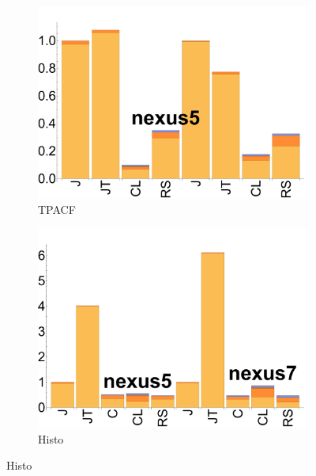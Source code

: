 \begin{figure}[ht]
  \begin{subfigure}[b]{0.3\textwidth}
      \includegraphics[width=\textwidth]{data/bbattery_tpacf.pdf}
      \caption{TPACF} \label{fig:b_TPACF}
  \end{subfigure}

  \begin{subfigure}[b]{0.3\textwidth}
      \includegraphics[width=\textwidth]{data/bbattery_histogram.pdf}
      \caption{Histo}\label{fig:b_histo}
  \end{subfigure}


\end{figure}
